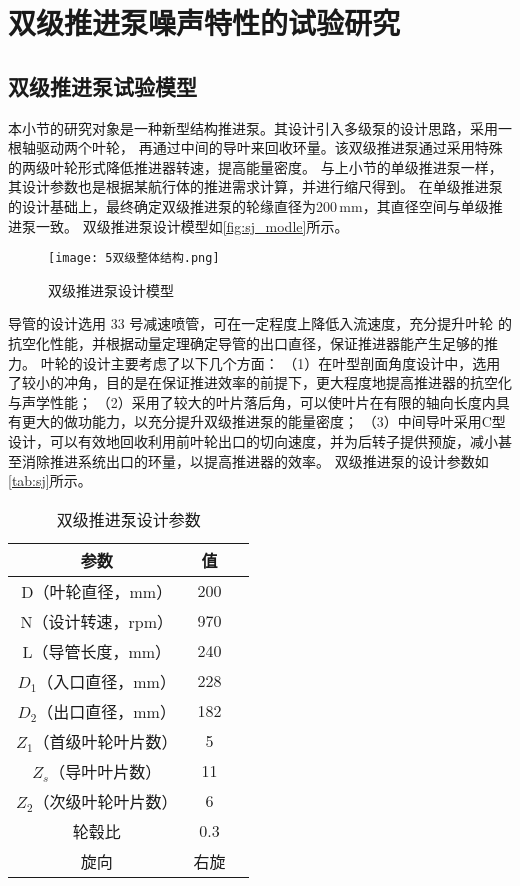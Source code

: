 \section{双级推进泵噪声特性的试验研究}
\subsection{双级推进泵试验模型}
本小节的研究对象是一种新型结构推进泵。其设计引入多级泵的设计思路，采用一根轴驱动两个叶轮，
再通过中间的导叶来回收环量。该双级推进泵通过采用特殊的两级叶轮形式降低推进器转速，提高能量密度。
与上小节的单级推进泵一样，其设计参数也是根据某航行体的推进需求计算，并进行缩尺得到。
在单级推进泵的设计基础上，最终确定双级推进泵的轮缘直径为200\,mm，其直径空间与单级推进泵一致。
双级推进泵设计模型如\autoref{fig:sj_modle}所示。
\begin{figure}[htbp]
    \centering
    \texttt{[image: 5双级整体结构.png]}
    \caption{\label{fig:sj_modle}双级推进泵设计模型}
\end{figure}

导管的设计选用 33 号减速喷管，可在一定程度上降低入流速度，充分提升叶轮
的抗空化性能，并根据动量定理确定导管的出口直径，保证推进器能产生足够的推力。
叶轮的设计主要考虑了以下几个方面：
（1）在叶型剖面角度设计中，选用了较小的冲角，目的是在保证推进效率的前提下，更大程度地提高推进器的抗空化与声学性能；
（2）采用了较大的叶片落后角，可以使叶片在有限的轴向长度内具有更大的做功能力，以充分提升双级推进泵的能量密度；
（3）中间导叶采用C型设计，可以有效地回收利用前叶轮出口的切向速度，并为后转子提供预旋，减小甚至消除推进系统出口的环量，以提高推进器的效率。
双级推进泵的设计参数如\autoref{tab:sj}所示。
\begin{table}[htbp]
    \centering
    \caption{\label{tab:sj}双级推进泵设计参数}
    \begin{tabular}{ccc}
     \toprule
     参数&值\\
     \midrule
     D（叶轮直径，mm）&200\\
     N（设计转速，rpm）&970\\
     L（导管长度，mm）&240\\
     $D_1$（入口直径，mm）&228\\
     $D_2$（出口直径，mm）&182\\
     $Z_1$（首级叶轮叶片数）&5\\
     $Z_s$（导叶叶片数）&11\\
     $Z_2$（次级叶轮叶片数）&6\\
     轮毂比&0.3\\
     旋向&右旋\\
     \bottomrule
    \end{tabular}
\end{table}

